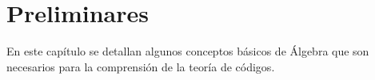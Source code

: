 \chapter{Preliminares}

En este capítulo se detallan algunos conceptos básicos de  Álgebra que son necesarios para la comprensión de la teoría de códigos.
